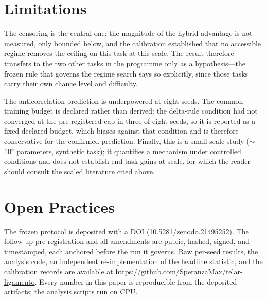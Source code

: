 \documentclass[jou,11pt,donotrepeattitle]{apa7}
\begin{document}
\section{Limitations}

The censoring is the central one: the magnitude of the hybrid advantage is not measured, only
bounded below, and the calibration established that no accessible regime removes the ceiling on
this task at this scale. The result therefore transfers to the two other tasks in the programme
only as a hypothesis---the frozen rule that governs the regime search says so explicitly, since
those tasks carry their own chance level and difficulty.

The anticorrelation prediction is underpowered at eight seeds. The common training budget is
declared rather than derived: the delta-rule condition had not converged at the pre-registered
cap in three of eight seeds, so it is reported as a fixed declared budget, which biases against
that condition and is therefore conservative for the confirmed prediction. Finally, this is a
small-scale study ($\sim$$10^5$ parameters, synthetic task); it quantifies a mechanism under
controlled conditions and does not establish end-task gains at scale, for which the reader
should consult the scaled literature cited above.

\section*{Open Practices}

The frozen protocol is deposited with a DOI (10.5281/zenodo.21495252). The follow-up
pre-registration and all amendments are public, hashed, signed, and timestamped, each anchored
before the run it governs. Raw per-seed results, the analysis code, an independent
re-implementation of the headline statistic, and the calibration records are available at
\url{https://github.com/SperanzaMax/telar-ligamento}. Every number in this paper is reproducible
from the deposited artifacts; the analysis scripts run on CPU.

\printbibliography
\end{document}
